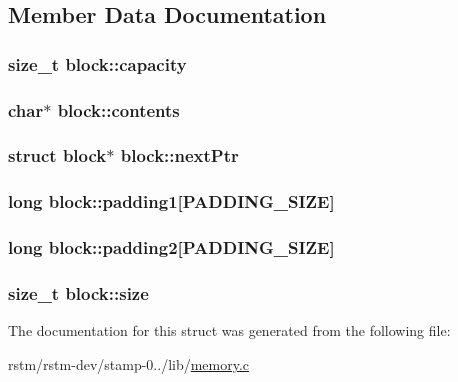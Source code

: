 \subsection{Member Data Documentation}
\hypertarget{structblock_aa877f807e4279d9d47401d1d4f0de680}{
\subsubsection[{capacity}]{\setlength{\rightskip}{0pt plus 5cm}size\-\_\-t block\-::capacity}}\label{structblock_aa877f807e4279d9d47401d1d4f0de680}
\hypertarget{structblock_a4ddc2427f5e4c0f9d95249b31f8cb524}{
\subsubsection[{contents}]{\setlength{\rightskip}{0pt plus 5cm}char$\ast$ block\-::contents}}\label{structblock_a4ddc2427f5e4c0f9d95249b31f8cb524}
\hypertarget{structblock_a1fe1396cf5e0f6ef16c967c9c1537314}{
\subsubsection[{next\-Ptr}]{\setlength{\rightskip}{0pt plus 5cm}struct {\bf block}$\ast$ block\-::next\-Ptr}}\label{structblock_a1fe1396cf5e0f6ef16c967c9c1537314}
\hypertarget{structblock_a476d5af9cbb3b23da97771d09ab6fbf8}{
\subsubsection[{padding1}]{\setlength{\rightskip}{0pt plus 5cm}long block\-::padding1\mbox{[}{\bf P\-A\-D\-D\-I\-N\-G\-\_\-\-S\-I\-Z\-E}\mbox{]}}}\label{structblock_a476d5af9cbb3b23da97771d09ab6fbf8}
\hypertarget{structblock_a5f97eac1d1f3a8a4d5e05f38e5038956}{
\subsubsection[{padding2}]{\setlength{\rightskip}{0pt plus 5cm}long block\-::padding2\mbox{[}{\bf P\-A\-D\-D\-I\-N\-G\-\_\-\-S\-I\-Z\-E}\mbox{]}}}\label{structblock_a5f97eac1d1f3a8a4d5e05f38e5038956}
\hypertarget{structblock_a40c8e08013eb90aa6db19e1cbc7f3186}{
\subsubsection[{size}]{\setlength{\rightskip}{0pt plus 5cm}size\-\_\-t block\-::size}}\label{structblock_a40c8e08013eb90aa6db19e1cbc7f3186}


The documentation for this struct was generated from the following file\-:\begin{DoxyCompactItemize}
\item 
rstm/rstm-\/dev/stamp-\/0../lib/\hyperlink{memory_8c}{memory.\-c}\end{DoxyCompactItemize}
